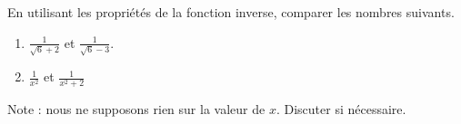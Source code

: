 
\begin{exercice}\label{exosmath-0292}

En utilisant les propriétés de la fonction inverse, comparer les nombres suivants.
    \begin{enumerate}
        \item
            \( \frac{1}{ \sqrt{6}+2 }\) et \( \frac{1}{ \sqrt{6}-3 }\).
        \item
            \( \frac{1}{ x^2 }\) et \( \frac{1}{ x^2+2 }\) 
    \end{enumerate}
    Note : nous ne supposons rien sur la valeur de \( x\). Discuter si nécessaire.

\end{exercice}
